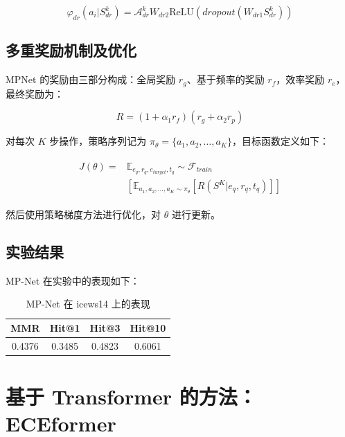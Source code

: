 \documentclass[a4paper, AutoFakeBold]{article}
\begin{document}
\begin{equation}
\varphi_{dr}(a_i|S^k_{dr})={\mathcal A}_{dr}^k W_{dr2}\text{ReLU}(dropout(W_{dr1}S^k_{dr}))
\end{equation}


\subsection{多重奖励机制及优化}

MPNet 的奖励由三部分构成：全局奖励 $r_g$、基于频率的奖励 $r_f$，效率奖励 $r_e$，最终奖励为：

\begin{equation}
R=(1+\alpha_1 r_f)(r_g+\alpha_2 r_p)
\end{equation}

对每次 $K$ 步操作，策略序列记为 $\pi_{\theta}=\{a_1,a_2,\dots,a_K\}$，目标函数定义如下：

\begin{equation}
\begin{aligned}
	\begin{split}
		J(\theta)= & {\mathbb E}_{e_q,r_q,e_{target},t_q}\sim{\mathcal F}_{train}\\
		& [{\mathbb E}_{a_1,a_2,\dots,a_K\sim\pi_{\theta}}[R(S^K|e_q,r_q,t_q)]]
	\end{split}
\end{aligned}
\end{equation}

然后使用策略梯度方法进行优化，对 $\theta$ 进行更新。

\subsection{实验结果}

MP-Net 在实验中的表现如下：




\begin{table}[htbp]
	\centering
	\caption{MP-Net 在 icews14 上的表现}
	\begin{tabular}{cccc}
		\toprule  %
		MMR&Hit@1&Hit@3&Hit@10 \\ 
		\midrule  %
		0.4376&0.3485&0.4823&0.6061 \\
		\bottomrule  %
	\end{tabular}
\end{table}






\section{基于 Transformer 的方法：ECEformer}
\end{document}
